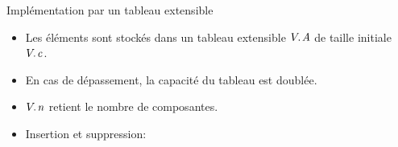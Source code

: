 \begin{frame}{Implémentation par un tableau extensible}

\begin{itemize}
\item Les éléments sont stockés dans un tableau extensible $\attrib{V}{A}$ de taille initiale $\attrib{V}{c}$.
\item En cas de dépassement, la capacité du tableau est \alert{doublée}.
\item $\attrib{V}{n}$ retient le nombre de composantes.
\item Insertion et suppression:

\begin{center}
\begin{footnotesize}
~~~~~
\end{footnotesize}
\end{center}


\end{itemize}

\end{frame}

